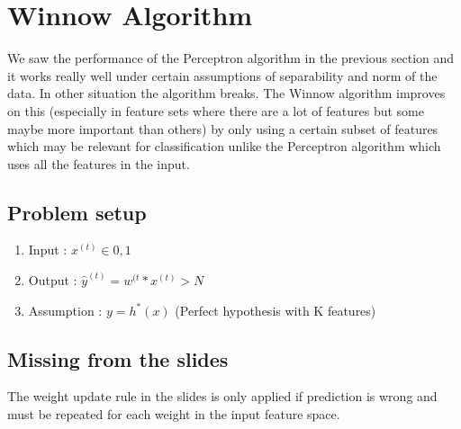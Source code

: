 \documentclass[11pt]{article}
\begin{document}
\section{Winnow Algorithm}

We saw the performance of the Perceptron algorithm in the previous section and it works really well under certain assumptions of separability and norm of the data. In other situation the algorithm breaks. The Winnow algorithm improves on this (especially in feature sets where there are a lot of features but some maybe more important than others) by only using a certain subset of features which may be relevant for classification unlike the Perceptron algorithm which uses all the features in the input.

\subsection{Problem setup}

\begin{enumerate}
    \item Input :  $x^{(t)} \in {0,1} $
    \item Output : $\hat{y}^{(t)} = w^{(t}*x^{(t)} > N$
    \item Assumption : $y=h^*(x)$ (Perfect hypothesis with K features)
\end{enumerate}

\subsection{Missing from the slides}

The weight update rule in the slides is only applied if prediction is wrong and must be repeated for each weight in the input feature space.
\end{document}

